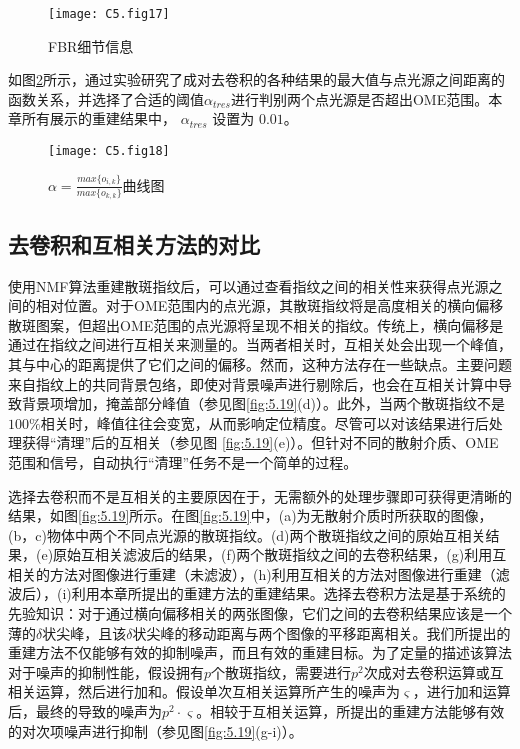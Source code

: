\begin{figure}[htp]
	\centering
	\texttt{[image: C5.fig17]}
	\caption{FBR细节信息}
	\label{fig:5.17}
\end{figure}

如图\ref{fig:5.18}所示，通过实验研究了成对去卷积的各种结果的最大值与点光源之间距离的函数关系，并选择了合适的阈值$\alpha_{tres}$进行判别两个点光源是否超出OME范围。本章所有展示的重建结果中， $\alpha_{tres}$ 设置为 $0.01$。

\begin{figure}[htp]
	\centering
	\texttt{[image: C5.fig18]}
	\caption{$\alpha= \frac {max\{o_{i,k}\}} {max\{o_{k,k}\}}$曲线图}
	\label{fig:5.18}
\end{figure}

\subsection{去卷积和互相关方法的对比}

使用NMF算法重建散斑指纹后，可以通过查看指纹之间的相关性来获得点光源之间的相对位置。对于OME范围内的点光源，其散斑指纹将是高度相关的横向偏移散斑图案，但超出OME范围的点光源将呈现不相关的指纹。传统上，横向偏移是通过在指纹之间进行互相关来测量的。当两者相关时，互相关处会出现一个峰值，其与中心的距离提供了它们之间的偏移。然而，这种方法存在一些缺点。主要问题来自指纹上的共同背景包络，即使对背景噪声进行剔除后，也会在互相关计算中导致背景项增加，掩盖部分峰值（参见图\ref{fig:5.19}(d)）。此外，当两个散斑指纹不是$100 \%$相关时，峰值往往会变宽，从而影响定位精度。尽管可以对该结果进行后处理获得“清理”后的互相关（参见图 \ref{fig:5.19}(e)）。但针对不同的散射介质、OME范围和信号，自动执行“清理”任务不是一个简单的过程。

选择去卷积而不是互相关的主要原因在于，无需额外的处理步骤即可获得更清晰的结果，如图\ref{fig:5.19}所示。在图\ref{fig:5.19}中，(a)为无散射介质时所获取的图像，(b，c)物体中两个不同点光源的散斑指纹。(d)两个散斑指纹之间的原始互相关结果，(e)原始互相关滤波后的结果，(f)两个散斑指纹之间的去卷积结果，(g)利用互相关的方法对图像进行重建（未滤波），(h)利用互相关的方法对图像进行重建（滤波后），(i)利用本章所提出的重建方法的重建结果。选择去卷积方法是基于系统的先验知识：对于通过横向偏移相关的两张图像，它们之间的去卷积结果应该是一个薄的$\delta$状尖峰，且该$\delta$状尖峰的移动距离与两个图像的平移距离相关。我们所提出的重建方法不仅能够有效的抑制噪声，而且有效的重建目标。为了定量的描述该算法对于噪声的抑制性能，假设拥有$p$个散斑指纹，需要进行$p^2$次成对去卷积运算或互相关运算，然后进行加和。假设单次互相关运算所产生的噪声为$\varsigma$，进行加和运算后，最终的导致的噪声为$p^2 \cdot \varsigma$。相较于互相关运算，所提出的重建方法能够有效的对次项噪声进行抑制（参见图\ref{fig:5.19}(g-i)）。


